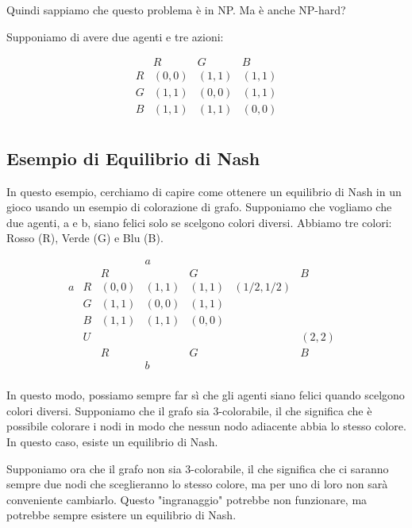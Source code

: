 Quindi sappiamo che questo problema è in NP. Ma è anche NP-hard?

Supponiamo di avere due agenti e tre azioni:

\[
    \begin{array}{cccc}
          & R     & G     & B     \\
        R & (0,0) & (1,1) & (1,1) \\
        G & (1,1) & (0,0) & (1,1) \\
        B & (1,1) & (1,1) & (0,0) \\
    \end{array}
\]

\subsection{Esempio di Equilibrio di Nash}

In questo esempio, cerchiamo di capire come ottenere un equilibrio di Nash in
un gioco usando un esempio di colorazione di grafo. Supponiamo che vogliamo che
due agenti, a e b, siano felici solo se scelgono colori diversi. Abbiamo tre
colori: Rosso (R), Verde (G) e Blu (B).

\[
    \begin{array}{cccccccc}
          &   &       & a     &       &            &       & \\
          &   & R     &       & G     &            & B     & \\
        a & R & (0,0) & (1,1) & (1,1) & (1/2, 1/2)           \\
          & G & (1,1) & (0,0) & (1,1)                        \\
          & B & (1,1) & (1,1) & (0,0)                        \\
          & U &       &       &       &            & (2,2)   \\
          &   & R     &       & G     &            & B     & \\
          &   &       & b     &       &            &       & \\
    \end{array}
\]

In questo modo, possiamo sempre far sì che gli agenti siano felici quando
scelgono colori diversi. Supponiamo che il grafo sia 3-colorabile, il che
significa che è possibile colorare i nodi in modo che nessun nodo adiacente
abbia lo stesso colore. In questo caso, esiste un equilibrio di Nash.

Supponiamo ora che il grafo non sia 3-colorabile, il che significa che ci
saranno sempre due nodi che sceglieranno lo stesso colore, ma per uno di loro
non sarà conveniente cambiarlo. Questo "ingranaggio" potrebbe non funzionare,
ma potrebbe sempre esistere un equilibrio di Nash.

